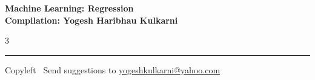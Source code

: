 \documentclass[8pt,landscape]{article}
\begin{document}
\footnotesize


\begin{center}
\Large{\textbf{Machine Learning: Regression\\ Compilation: Yogesh Haribhau Kulkarni}}
\end{center}

\begin{multicols}{3}

\end{multicols}

\rule{\linewidth}{0.25pt}
\scriptsize
Copyleft \textcopyleft\  Send suggestions to
\href{http://www.yogeshkulkarni.com}{yogeshkulkarni@yahoo.com}
\end{document}

